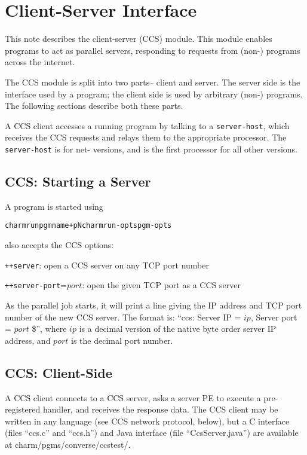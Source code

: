 \chapter{\converse{} Client-Server Interface}

This note describes the \converse{} client-server (CCS) 
module. This module enables \converse{} programs to act as
parallel servers, responding to requests from (non-\converse{}) programs
across the internet.

The CCS module is split into two parts-- client and server. 
The server side is the interface used by a \converse{} program;
the client side is used by arbitrary (non-\converse{}) programs.
The following sections describe both these parts. 

A CCS client accesses a running \converse{} program by talking to
a {\tt server-host}, which receives the CCS requests and relays them
to the appropriate processor.  The {\tt server-host} is 
for net- versions, and is the first processor for all other versions.


\section{CCS: Starting a Server}
A \converse{} program is started using
\begin{alltt}
charmrun pgmname +pN charmrun-opts pgm-opts
\end{alltt}
 also accepts the CCS options:

{\tt ++server}: open a CCS server on any TCP port number

{\tt ++server-port}=$port$: open the given TCP port as a CCS server   

As the parallel job starts, it will print a line giving the 
IP address and TCP port number of the new CCS server.
The format is: ``ccs: Server IP = $ip$, Server port = $port$ \$'',
where $ip$ is a decimal version of the native byte order 
server IP address, and $port$ is the decimal port number.


\section{CCS: Client-Side}

A CCS client connects to a CCS server, asks a server PE to 
execute a pre-registered handler, and receives the response data.
The CCS client may be written in any language (see CCS network protocol,
below), but a C interface (files ``ccs.c'' and ``ccs.h'') and Java
interface (file ``CcsServer.java'') are available at 
charm/pgms/converse/ccstest/.


